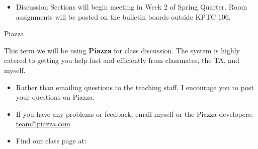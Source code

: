   \begin{itemize}

    \item Discussion Sections will begin meeting in Week 2 of Spring Quarter.  Room assignments will be posted on the bulletin boards outside KPTC 106.

  \end{itemize}
  


\noindent \underline{Piazza}

\noindent This term we will be using \textbf{Piazza} for class discussion. The system is highly catered to getting you help fast and efficiently from classmates, the TA, and myself. 

\begin{itemize}

  \item Rather than emailing questions to the teaching staff, I encourage you to post your questions on Piazza. 

  \item If you have any problems or feedback, email myself or the Piazza developers: \href{mailto:team@piazza.com}{team@piazza.com}

  \item Find our class page at: \PiazzaLink
  
\end{itemize}  

%
%
%
%  

